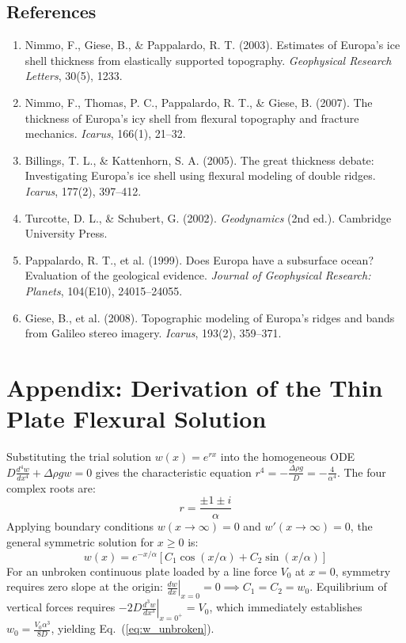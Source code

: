 \documentclass[11pt,a4paper]{article}
\begin{document}
\subsection*{References}
\begin{enumerate}
    \item Nimmo, F., Giese, B., \& Pappalardo, R. T. (2003). Estimates of Europa's ice shell thickness from elastically supported topography. \textit{Geophysical Research Letters}, 30(5), 1233.
    \item Nimmo, F., Thomas, P. C., Pappalardo, R. T., \& Giese, B. (2007). The thickness of Europa's icy shell from flexural topography and fracture mechanics. \textit{Icarus}, 166(1), 21--32.
    \item Billings, T. L., \& Kattenhorn, S. A. (2005). The great thickness debate: Investigating Europa's ice shell using flexural modeling of double ridges. \textit{Icarus}, 177(2), 397--412.
    \item Turcotte, D. L., \& Schubert, G. (2002). \textit{Geodynamics} (2nd ed.). Cambridge University Press.
    \item Pappalardo, R. T., et al. (1999). Does Europa have a subsurface ocean? Evaluation of the geological evidence. \textit{Journal of Geophysical Research: Planets}, 104(E10), 24015--24055.
    \item Giese, B., et al. (2008). Topographic modeling of Europa's ridges and bands from Galileo stereo imagery. \textit{Icarus}, 193(2), 359--371.
\end{enumerate}

\appendix
\section{Appendix: Derivation of the Thin Plate Flexural Solution}
Substituting the trial solution $w(x) = e^{rx}$ into the homogeneous ODE $D \frac{d^4 w}{dx^4} + \Delta\rho g w = 0$ gives the characteristic equation $r^4 = -\frac{\Delta\rho g}{D} = -\frac{4}{\alpha^4}$. The four complex roots are:
\begin{equation}
r = \frac{\pm 1 \pm i}{\alpha}
\end{equation}
Applying boundary conditions $w(x \to \infty) = 0$ and $w'(x \to \infty) = 0$, the general symmetric solution for $x \ge 0$ is:
\begin{equation}
w(x) = e^{-x/\alpha} \left[ C_1 \cos(x/\alpha) + C_2 \sin(x/\alpha) \right]
\end{equation}
For an unbroken continuous plate loaded by a line force $V_0$ at $x=0$, symmetry requires zero slope at the origin: $\left.\frac{dw}{dx}\right|_{x=0} = 0 \implies C_1 = C_2 = w_0$. Equilibrium of vertical forces requires $-2 D \left.\frac{d^3w}{dx^3}\right|_{x=0^+} = V_0$, which immediately establishes $w_0 = \frac{V_0 \alpha^3}{8D}$, yielding Eq.~(\ref{eq:w_unbroken}).
\end{document}
